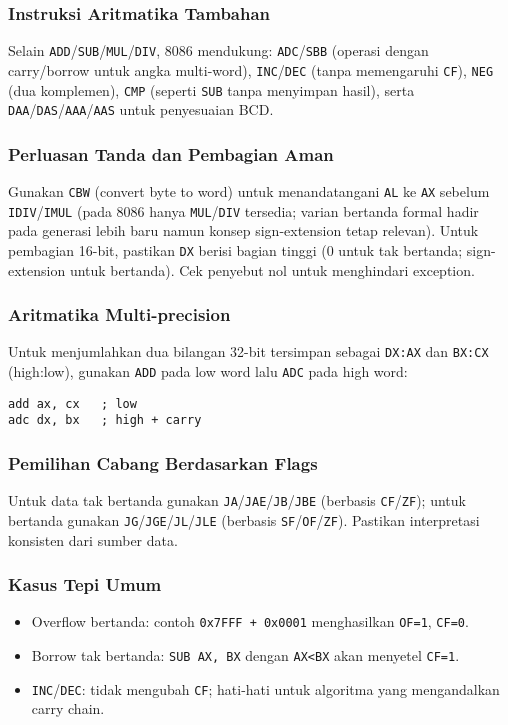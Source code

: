 \subsubsection{Instruksi Aritmatika Tambahan}
Selain \texttt{ADD}/\texttt{SUB}/\texttt{MUL}/\texttt{DIV}, 8086 mendukung: \texttt{ADC}/\texttt{SBB} (operasi dengan carry/borrow untuk angka multi-word), \texttt{INC}/\texttt{DEC} (tanpa memengaruhi \texttt{CF}), \texttt{NEG} (dua komplemen), \texttt{CMP} (seperti \texttt{SUB} tanpa menyimpan hasil), serta \texttt{DAA}/\texttt{DAS}/\texttt{AAA}/\texttt{AAS} untuk penyesuaian BCD.

\subsubsection{Perluasan Tanda dan Pembagian Aman}
Gunakan \texttt{CBW} (convert byte to word) untuk menandatangani \texttt{AL} ke \texttt{AX} sebelum \texttt{IDIV}/\texttt{IMUL} (pada 8086 hanya \texttt{MUL}/\texttt{DIV} tersedia; varian bertanda formal hadir pada generasi lebih baru namun konsep sign-extension tetap relevan). Untuk pembagian 16-bit, pastikan \texttt{DX} berisi bagian tinggi (0 untuk tak bertanda; sign-extension untuk bertanda). Cek penyebut nol untuk menghindari exception.

\subsubsection{Aritmatika Multi-precision}
Untuk menjumlahkan dua bilangan 32-bit tersimpan sebagai \texttt{DX:AX} dan \texttt{BX:CX} (high:low), gunakan \texttt{ADD} pada low word lalu \texttt{ADC} pada high word:
\begin{verbatim}
add ax, cx   ; low
adc dx, bx   ; high + carry
\end{verbatim}

\subsubsection{Pemilihan Cabang Berdasarkan Flags}
Untuk data tak bertanda gunakan \texttt{JA}/\texttt{JAE}/\texttt{JB}/\texttt{JBE} (berbasis \texttt{CF}/\texttt{ZF}); untuk bertanda gunakan \texttt{JG}/\texttt{JGE}/\texttt{JL}/\texttt{JLE} (berbasis \texttt{SF}/\texttt{OF}/\texttt{ZF}). Pastikan interpretasi konsisten dari sumber data.

\subsubsection{Kasus Tepi Umum}
\begin{itemize}
  \item Overflow bertanda: contoh \texttt{0x7FFF + 0x0001} menghasilkan \texttt{OF=1}, \texttt{CF=0}.
  \item Borrow tak bertanda: \texttt{SUB AX, BX} dengan \texttt{AX<BX} akan menyetel \texttt{CF=1}.
  \item \texttt{INC}/\texttt{DEC}: tidak mengubah \texttt{CF}; hati-hati untuk algoritma yang mengandalkan carry chain.
\end{itemize}

